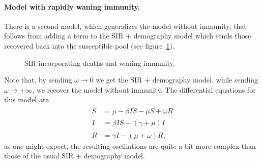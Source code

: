 \documentclass[12pt]{article}
\begin{document}
\paragraph{Model with rapidly waning immunity.} There is a second model, which generalizes the model without immunity, that follows from adding a term to the SIR + demography model which sends those recovered back into the susceptible pool (see figure~\ref{fig:sir-immunity}).
\begin{figure}[ht!]
\centering
{}
\caption{SIR incorporating deaths and waning immunity.}
\label{fig:sir-immunity}
\end{figure}
Note that, by sending $\omega \to 0$ we get the SIR + demography model, while sending $\omega \to +\infty$, we recover the model without immunity. The differential equations for this model are
\[
\begin{aligned}
	\dot S &= \mu - \beta IS - \mu S + \omega R\\
	\dot I &= \beta IS - (\gamma + \mu) I\\
	\dot R &= \gamma I - (\mu + \omega) R,
\end{aligned}
\]
as one might expect, the resulting oscillations are quite a bit more complex than those of the usual SIR + demography model.
\end{document}
